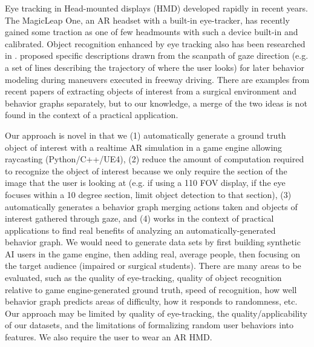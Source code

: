 
Eye tracking in Head-mounted displays (HMD) developed rapidly in recent years\cite{cognolato2018head}. The MagicLeap One, an AR headset with a built-in eye-tracker, has recently gained some traction as one of few headmounts with such a device built-in and calibrated. Object recognition enhanced by eye tracking also has been researched in \cite{toyama2012gaze, wolf2018automating}. \cite{martin2018dynamics} proposed specific descriptions drawn from the scanpath of gaze direction (e.g. a set of lines describing the trajectory of where the user looks) for later behavior modeling during maneuvers executed in freeway driving. There are examples from recent papers of extracting objects of interest from a surgical environment and behavior graphs separately, but to our knowledge, a merge of the two ideas is not found in the context of a practical application. 

Our approach is novel in that we (1) automatically generate a ground truth object of interest with a realtime AR simulation in a game engine allowing raycasting (Python/C++/UE4), (2) reduce the amount of computation required to recognize the object of interest because we only require the section of the image that the user is looking at (e.g. if using a 110 FOV display, if the eye focuses within a 10 degree section, limit object detection to that section), (3) automatically generates a behavior graph merging actions taken and objects of interest gathered through gaze, and (4) works in the context of practical applications to find real benefits of analyzing an automatically-generated behavior graph. We would need to generate data sets by first building synthetic AI users in the game engine, then adding real, average people, then focusing on the target audience (impaired or surgical students). There are many areas to be evaluated, such as the quality of eye-tracking, quality of object recognition relative to game engine-generated ground truth, speed of recognition, how well behavior graph predicts areas of difficulty, how it responds to randomness, etc. Our approach may be limited by quality of eye-tracking, the quality/applicability of our datasets, and the limitations of formalizing random user behaviors into features. We also require the user to wear an AR HMD.






